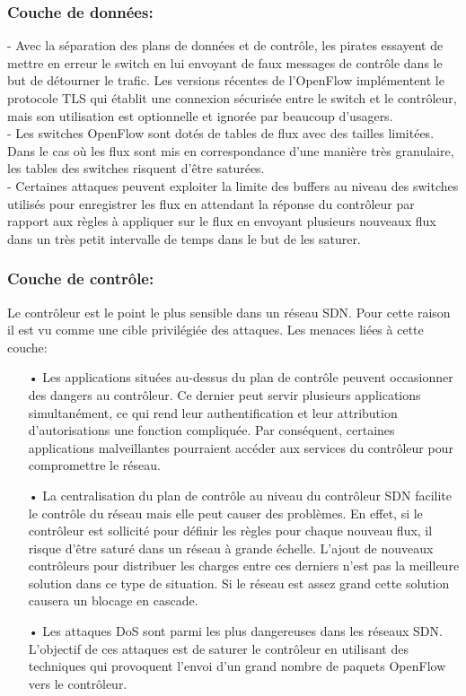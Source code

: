 \subsubsection{Couche de données:}
- Avec la séparation des plans de données et de contrôle, les pirates essayent de mettre en erreur le switch en lui envoyant de faux messages de contrôle dans le but de détourner le trafic. Les versions récentes de l’OpenFlow implémentent le protocole TLS qui établit une connexion sécurisée entre le switch et le contrôleur, mais son utilisation est optionnelle et ignorée par beaucoup d’usagers.\\

- Les switches OpenFlow sont dotés de tables de flux avec des tailles limitées. Dans le cas où les flux sont mis en correspondance d’une manière très granulaire, les tables des switches risquent d’être saturées.\\

- Certaines attaques peuvent exploiter la limite des buffers au niveau des switches utilisés pour enregistrer les flux en attendant la réponse du contrôleur par rapport aux règles à appliquer sur le flux  en envoyant plusieurs nouveaux flux dans un très petit intervalle de temps dans le but de les saturer.

\subsubsection{Couche de contrôle:} 
Le contrôleur est le point le plus sensible dans un réseau SDN. Pour cette raison il est vu comme une cible privilégiée des attaques. Les menaces liées à cette couche:\\
\begin{itemize}
\item[•]Les applications situées au-dessus du plan de contrôle peuvent occasionner des dangers au contrôleur. Ce dernier peut servir plusieurs applications simultanément, ce qui rend leur authentification et leur attribution d’autorisations une fonction compliquée. Par conséquent, certaines applications malveillantes pourraient accéder aux services du contrôleur pour compromettre le réseau.\\
\item[•]La centralisation du plan de contrôle au niveau du contrôleur SDN facilite le contrôle du réseau mais elle peut causer des problèmes. En effet, si le contrôleur est sollicité pour définir les règles pour chaque nouveau flux, il risque d’être saturé dans un réseau à grande échelle. L’ajout de nouveaux contrôleurs pour distribuer les charges entre ces derniers n’est pas la meilleure solution dans ce type de situation. Si le réseau est assez grand cette solution causera un blocage en cascade.\\
\item[•]Les attaques DoS sont parmi les plus dangereuses dans les réseaux SDN. L’objectif de ces attaques est de saturer le contrôleur en utilisant des techniques qui provoquent l’envoi d’un grand nombre de paquets OpenFlow vers le contrôleur. 
\end{itemize}

